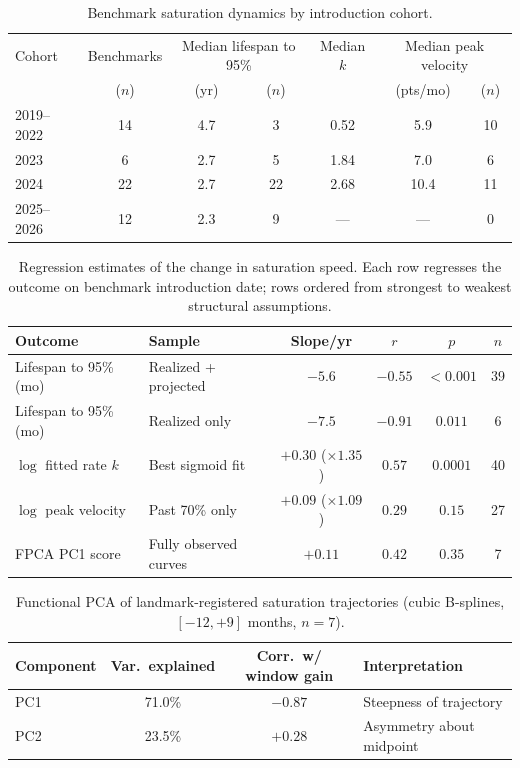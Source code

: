 \begin{table}[t]
\centering
\caption{Benchmark saturation dynamics by introduction cohort.}
\label{tab:cohorts}
\begin{tabular}{lcccccc}
\toprule
Cohort & Benchmarks & \multicolumn{2}{c}{Median lifespan to 95\%} & Median $k$ & \multicolumn{2}{c}{Median peak velocity} \\
 & ($n$) & (yr) & ($n$) & & (pts/mo) & ($n$) \\
\midrule
2019--2022 & 14 & 4.7 & 3  & 0.52 & 5.9  & 10 \\
2023       & 6  & 2.7 & 5  & 1.84 & 7.0  & 6  \\
2024       & 22 & 2.7 & 22 & 2.68 & 10.4 & 11 \\
2025--2026 & 12 & 2.3 & 9  & ---  & ---  & 0  \\
\bottomrule
\end{tabular}
\end{table}

\begin{table}[t]
\centering
\caption{Regression estimates of the change in saturation speed. Each row regresses the outcome on benchmark introduction date; rows ordered from strongest to weakest structural assumptions.}
\label{tab:regressions}
\begin{tabular}{llcccc}
\toprule
Outcome & Sample & Slope/yr & $r$ & $p$ & $n$ \\
\midrule
Lifespan to 95\% (mo) & Realized + projected      & $-5.6$ & $-0.55$ & $<0.001$ & 39 \\
Lifespan to 95\% (mo) & Realized only             & $-7.5$ & $-0.91$ & $0.011$  & 6  \\
$\log$ fitted rate $k$ & Best sigmoid fit          & $+0.30$ ($\times1.35$) & $0.57$ & $0.0001$ & 40 \\
$\log$ peak velocity   & Past 70\% only            & $+0.09$ ($\times1.09$) & $0.29$ & $0.15$   & 27 \\
FPCA PC1 score         & Fully observed curves     & $+0.11$ & $0.42$ & $0.35$ & 7 \\
\bottomrule
\end{tabular}
\end{table}

\begin{table}[t]
\centering
\caption{Functional PCA of landmark-registered saturation trajectories (cubic B-splines, $[-12,+9]$ months, $n=7$).}
\label{tab:fpca}
\begin{tabular}{lccl}
\toprule
Component & Var.\ explained & Corr.\ w/ window gain & Interpretation \\
\midrule
PC1 & 71.0\% & $-0.87$ & Steepness of trajectory \\
PC2 & 23.5\% & $+0.28$ & Asymmetry about midpoint \\
\bottomrule
\end{tabular}
\end{table}


